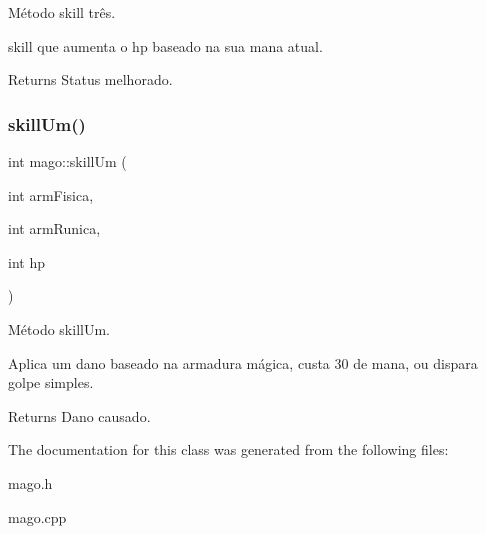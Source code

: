Método skill três. 

skill que aumenta o hp baseado na sua mana atual. \begin{DoxyReturn}{Returns}
Status melhorado. 
\end{DoxyReturn}
\mbox{\label{classmago_a039c9975fad5dbc54d5f3ab51bf3df44}} 
\subsubsection{\texorpdfstring{skill\+Um()}{skillUm()}}
{\footnotesize\ttfamily int mago\+::skill\+Um (\begin{DoxyParamCaption}\item[{int}]{arm\+Fisica,  }\item[{int}]{arm\+Runica,  }\item[{int}]{hp }\end{DoxyParamCaption})}



Método skill\+Um. 

Aplica um dano baseado na armadura mágica, custa 30 de mana, ou dispara golpe simples. \begin{DoxyReturn}{Returns}
Dano causado. 
\end{DoxyReturn}


The documentation for this class was generated from the following files\+:\begin{DoxyCompactItemize}
\item 
mago.\+h\item 
mago.\+cpp\end{DoxyCompactItemize}
